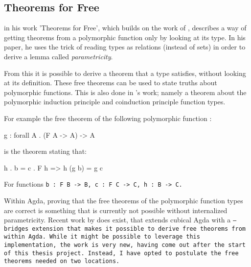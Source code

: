 
\subsection{Theorems for Free}\label{sec:free}
\cite{Wadler1989} in his work 'Theorems for Free', which builds on the work of \cite{Reynolds1983}, describes a way of getting theorems from a polymorphic function only by looking at its type.
In his paper, he uses the trick of reading types as relations (instead of sets) in order to derive a lemma called \textit{parametricity}.

From this it is possible to derive a theorem that a type satisfies, without looking at its definition.
These free theorems can be used to state truths about polymorphic functions.
This is also done in \cite{Harper2011}'s work; namely a theorem about the polymorphic induction principle and coinduction principle function types.

For example the free theorem of the following polymorphic function \citep{Harper2011}:
\begin{code}
g : forall A . (F A -> A) -> A
\end{code}
is the theorem stating that:
\begin{code}
h . b = c . F h => h (g b) = g c
\end{code}
For functions \tt{b : F B -> B}, \tt{c : F C -> C}, \tt{h : B -> C}.


Within Agda, proving that the free theorems of the polymorphic function types are correct is something that is currently not possible without internalized parametricity.
Recent work by \cite{Muylder2024} does exist, that extends cubical Agda with a \tt{--bridges} extension that makes it possible to derive free theorems from within Agda.
While it might be possible to leverage this implementation, the work is very new, having come out after the start of this thesis project.
Instead, I have opted to postulate the free theorems needed on two locations.
